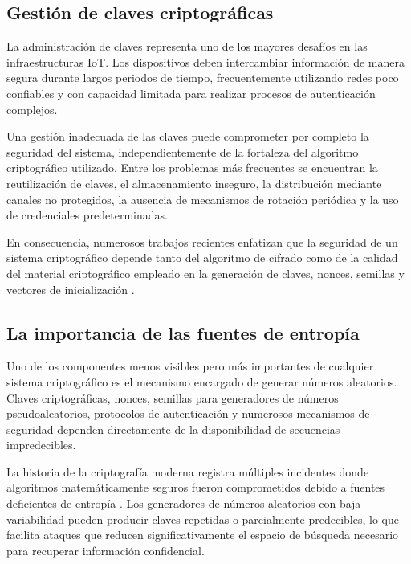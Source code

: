 \subsection{Gestión de claves criptográficas}

La administración de claves representa uno de los mayores desafíos en las infraestructuras IoT. Los dispositivos deben intercambiar información de manera segura durante largos periodos de tiempo, frecuentemente utilizando redes poco confiables y con capacidad limitada para realizar procesos de autenticación complejos.

Una gestión inadecuada de las claves puede comprometer por completo la seguridad del sistema, independientemente de la fortaleza del algoritmo criptográfico utilizado. Entre los problemas más frecuentes se encuentran la reutilización de claves, el almacenamiento inseguro, la distribución mediante canales no protegidos, la ausencia de mecanismos de rotación periódica y la uso de credenciales predeterminadas.

En consecuencia, numerosos trabajos recientes enfatizan que la seguridad de un sistema criptográfico depende tanto del algoritmo de cifrado como de la calidad del material criptográfico empleado en la generación de claves, nonces, semillas y vectores de inicialización \cite{MITRE2024CWE-327:Algorithm}.

\subsection{La importancia de las fuentes de entropía}

Uno de los componentes menos visibles pero más importantes de cualquier sistema criptográfico es el mecanismo encargado de generar números aleatorios. Claves criptográficas, nonces, semillas para generadores de números pseudoaleatorios, protocolos de autenticación y numerosos mecanismos de seguridad dependen directamente de la disponibilidad de secuencias impredecibles.

La historia de la criptografía moderna registra múltiples incidentes donde algoritmos matemáticamente seguros fueron comprometidos debido a fuentes deficientes de entropía \cite{Menezes1996HandbookCryptography,Klimushyn2022Crypto-ResistantDevices}. Los generadores de números aleatorios con baja variabilidad pueden producir claves repetidas o parcialmente predecibles, lo que facilita ataques que reducen significativamente el espacio de búsqueda necesario para recuperar información confidencial.

